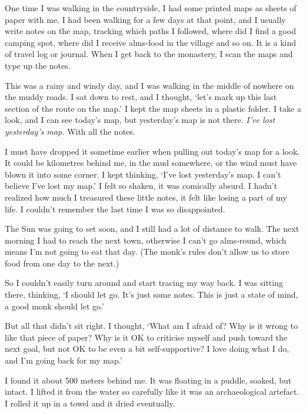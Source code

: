 
One time I was walking in the countryside, I had some printed maps as
sheets of paper with me. I had been walking for a few days at that
point, and I usually write notes on the map, tracking which paths I
followed, where did I find a good camping spot, where did I receive
alms-food in the village and so on. It is a kind of travel log or
journal. When I get back to the monastery, I scan the maps and type up
the notes.

This was a rainy and windy day, and I was walking in the middle of
nowhere on the muddy roads. I sat down to rest, and I thought, `let's
mark up this last section of the route on the map.' I kept the map
sheets in a plastic folder. I take a look, and I can see today's map,
but yesterday's map is not there. \emph{I've lost yesterday's map.} With
all the notes.

I must have dropped it sometime earlier when pulling out today's map for
a look. It could be kilometres behind me, in the mud somewhere, or the
wind must have blown it into some corner. I kept thinking, `I've lost
yesterday's map. I can't believe I've lost my map.' I felt so shaken, it
was comically absurd. I hadn't realized how much I treasured these
little notes, it felt like losing a part of my life. I couldn't remember
the last time I was so disappointed.

The Sun was going to set soon, and I still had a lot of distance to
walk. The next morning I had to reach the next town, otherwise I can't
go alms-round, which means I'm not going to eat that day. (The monk's
rules don't allow us to store food from one day to the next.)

So I couldn't easily turn around and start tracing my way back. I was
sitting there, thinking, `I should let go. It's just some notes. This is
just a state of mind, a good monk should let go.'

But all that didn't sit right. I thought, `What am I afraid of? Why is
it wrong to like that piece of paper? Why is it OK to criticise myself
and push toward the next goal, but not OK to be even a bit
self-supportive? I love doing what I do, and I'm going back for my map.'

I found it about 500 meters behind me. It was floating in a puddle,
soaked, but intact. I lifted it from the water so carefully like it was
an archaeological artefact. I rolled it up in a towel and it dried
eventually.

